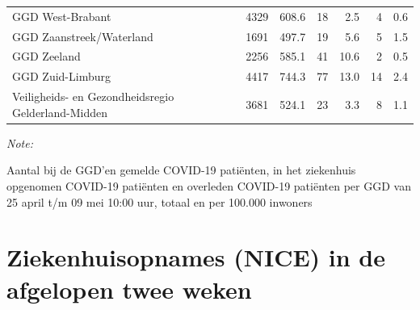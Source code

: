\documentclass[
  english,
  man,floatsintext]{apa6}
\begin{document}
\begin{table}
\begin{threeparttable}
\begin{tabular}{lrrrrrr}
GGD West-Brabant & 4329 & 608.6 & 18 & 2.5 & 4 & 0.6\\
GGD Zaanstreek/Waterland & 1691 & 497.7 & 19 & 5.6 & 5 & 1.5\\
GGD Zeeland & 2256 & 585.1 & 41 & 10.6 & 2 & 0.5\\
GGD Zuid-Limburg & 4417 & 744.3 & 77 & 13.0 & 14 & 2.4\\
Veiligheids- en Gezondheidsregio Gelderland-Midden & 3681 & 524.1 & 23 & 3.3 & 8 & 1.1\\
\bottomrule
\end{tabular}
\begin{tablenotes}
\item \textit{Note: } 
\item Aantal bij de GGD’en gemelde COVID-19 patiënten, in het ziekenhuis opgenomen COVID-19 patiënten en overleden COVID-19 patiënten per GGD van 25 april t/m 09 mei 10:00 uur, totaal en per 100.000 inwoners
\end{tablenotes}
\end{threeparttable}
\endgroup{}
\end{table}

\newpage

\hypertarget{ziekenhuisopnames-nice-in-de-afgelopen-twee-weken}{%
\section{Ziekenhuisopnames (NICE) in de afgelopen twee weken}\label{ziekenhuisopnames-nice-in-de-afgelopen-twee-weken}}
\end{document}
